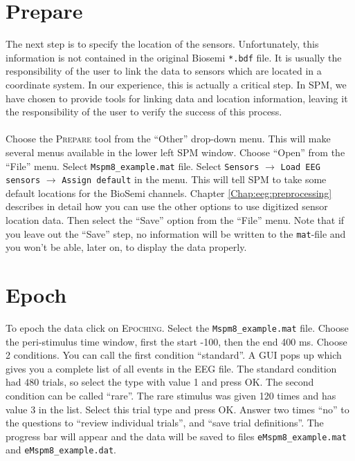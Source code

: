 \section{Prepare}
The next step is to specify the location of the sensors. Unfortunately, this information is not contained in the original Biosemi \texttt{*.bdf} file. It is usually the responsibility of the user to link the data to sensors which are located in a coordinate system. In our experience, this is actually a critical step. In SPM, we have chosen to provide tools for linking data and location information, leaving it the responsibility of the user to verify the success of this process.
\\
\\
Choose the \textsc{Prepare} tool from the ``Other'' drop-down menu. This will make several menus available in the lower left SPM window. Choose ``Open'' from the ``File'' menu. Select \texttt{Mspm8\_example.mat} file. Select \texttt{Sensors} $\rightarrow$ \texttt{Load EEG sensors} $\rightarrow$ \texttt{Assign default} in the menu. This will tell SPM to take some default locations for the BioSemi channels. Chapter \ref{Chap:eeg:preprocessing} describes in detail how you can use the other options to use digitized sensor location data. Then select the ``Save'' option from the ``File'' menu. Note that if you leave out the ``Save'' step, no information will be written to the \texttt{mat}-file and you won't be able, later on, to display the data properly.

\section{Epoch}
To epoch the data click on \textsc{Epoching}. Select the \texttt{Mspm8\_example.mat} file. Choose the peri-stimulus time window, first the start -100, then the end 400 ms. Choose 2 conditions. You can call the first condition ``standard''. A GUI pops up which gives you a complete list of all events in the EEG file. The standard condition had 480 trials, so select the type with value 1 and press OK. The second condition can be called ``rare''. The rare stimulus was given 120 times and has value 3 in the list. Select this trial type and press OK. Answer two times ``no'' to the questions to ``review individual trials'', and ``save trial definitions''. The progress bar will appear and the data will be saved to files \texttt{eMspm8\_example.mat} and \texttt{eMspm8\_example.dat}.

